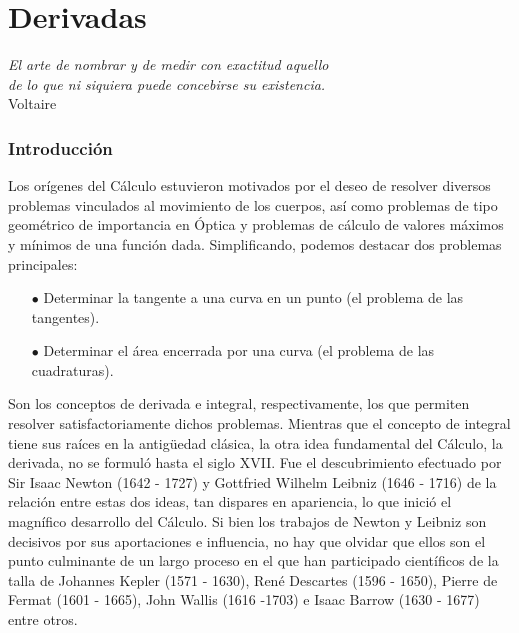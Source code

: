 
\chapter{Derivadas}

\PartialToc

\hypersetup{linkcolor=ptctitle}

\vspace*{0.5cm}
 
\begin{flushright}
\textit{\small{}El arte de nombrar y de medir con exactitud aquello
}\\
\textit{\small{} de lo que ni siquiera puede concebirse su existencia.}{\small{}
}\\
{\small{} Voltaire} 
\par\end{flushright}

\vspace*{-1mm}
 

\subsection{Introducción}

Los orígenes del Cálculo estuvieron motivados por el deseo de resolver
diversos problemas vinculados al movimiento de los cuerpos, así como
problemas de tipo geométrico de importancia en Óptica y problemas
de cálculo de valores máximos y mínimos de una función dada. Simplificando,
podemos destacar dos problemas principales: 
\begin{itemize}
\item[$\bullet$] Determinar la tangente a una curva en un punto (el problema de las
tangentes). 
\item[$\bullet$] Determinar el área encerrada por una curva (el problema de las cuadraturas). 
\end{itemize}
Son los conceptos de derivada e integral, respectivamente, los que
permiten resolver satisfactoriamente dichos problemas. Mientras que
el concepto de integral tiene sus raíces en la antigüedad clásica,
la otra idea fundamental del Cálculo, la derivada, no se formuló hasta
el siglo XVII. Fue el descubrimiento efectuado por Sir Isaac Newton
(1642 - 1727) y Gottfried Wilhelm Leibniz (1646 - 1716) de la relación
entre estas dos ideas, tan dispares en apariencia, lo que inició el
magnífico desarrollo del Cálculo. Si bien los trabajos de Newton y
Leibniz son decisivos por sus aportaciones e influencia, no hay que
olvidar que ellos son el punto culminante de un largo proceso en el
que han participado científicos de la talla de Johannes Kepler (1571
- 1630), René Descartes (1596 - 1650), Pierre de Fermat (1601 - 1665),
John Wallis (1616 -1703) e Isaac Barrow (1630 - 1677) entre otros.

